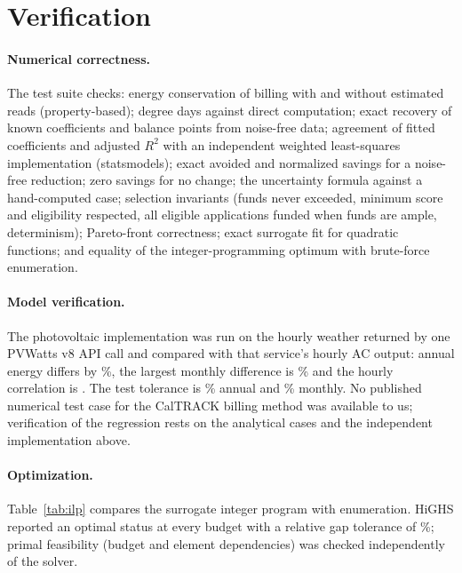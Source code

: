 \documentclass[11pt]{article}
\begin{document}
\section{Verification}

\paragraph{Numerical correctness.} The test suite checks: energy conservation of billing
with and without estimated reads (property-based); degree days against direct
computation; exact recovery of known coefficients and balance points from noise-free
data; agreement of fitted coefficients and adjusted $R^2$ with an independent weighted
least-squares implementation (statsmodels); exact avoided and normalized savings for a
noise-free reduction; zero savings for no change; the uncertainty formula against a
hand-computed case; selection invariants (funds never exceeded, minimum score and
eligibility respected, all eligible applications funded when funds are ample,
determinism); Pareto-front correctness; exact surrogate fit for quadratic functions; and
equality of the integer-programming optimum with brute-force enumeration.

\paragraph{Model verification.} The photovoltaic implementation was run on the hourly
weather returned by one PVWatts v8 API call \cite{pvwatts8api} and compared with that
service's hourly AC output: annual energy differs by \PvRefAnnualDiff\%, the largest
monthly difference is \PvRefMonthlyMaxDiff\% and the hourly correlation is
\PvRefCorrelation. The test tolerance is \CfgPvTolAnnual\% annual and \CfgPvTolMonthly\% monthly. No published numerical
test case for the CalTRACK billing method was available to us; verification of the
regression rests on the analytical cases and the independent implementation above.

\paragraph{Optimization.} Table~\ref{tab:ilp} compares the surrogate integer program
with enumeration. HiGHS reported an optimal status at every budget with a relative gap
tolerance of \IlpGap\%; primal feasibility (budget and element dependencies) was checked
independently of the solver.

\begin{table}[h]
\caption{Surrogate integer program against exhaustive enumeration (loss
$\mathcal{L}_1$, \%).}\label{tab:ilp}
\centering\footnotesize\setlength{\tabcolsep}{3.5pt}

\end{table}
\end{document}
